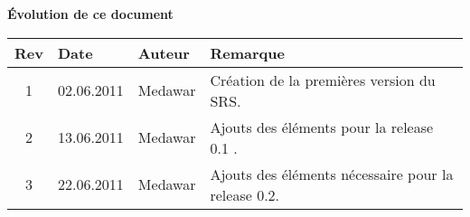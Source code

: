 \begin{large}
\textbf{Évolution de ce  document\\}
\end{large}
\begin{tabular}{|c|l|l|l|}
\hline  Rev &  Date &  Auteur & Remarque \\ 
\hline  1 &  02.06.2011 & Medawar  & Création de la premières version du SRS. \\ 
\hline  2 &  13.06.2011 & Medawar  & Ajouts des éléments pour la release 0.1  . \\ 
\hline  3 &  22.06.2011 & Medawar  & Ajouts des éléments nécessaire pour la release 0.2. \\ 
\hline 
\end{tabular} 